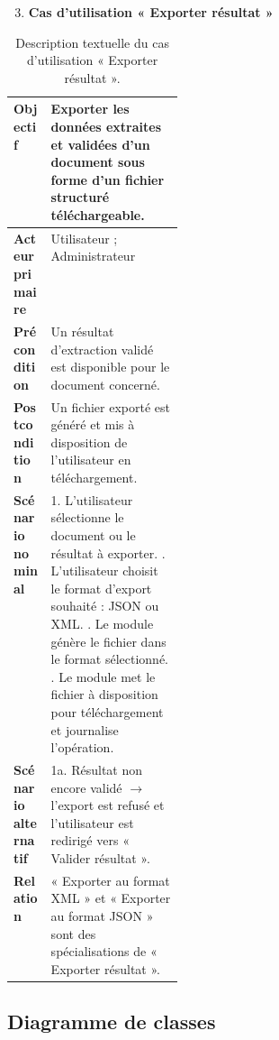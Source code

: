 \begin{enumerate}
    \setcounter{enumi}{2}
    \item \textbf{Cas d'utilisation « Exporter résultat »}
\end{enumerate}

\begin{table}[H]
    \centering
    \caption{Description textuelle du cas d'utilisation « Exporter résultat ».}
    \label{tab:cu-exporter-resultat}
    \begin{tabularx}{\linewidth}{|p{0.22\linewidth}|X|}
        \hline
        \rowcolor[HTML]{FFCCCC}
        \textbf{Objectif} & Exporter les données extraites et validées d'un document sous forme
        d'un fichier structuré téléchargeable. \\
        \hline
        \textbf{Acteur primaire} & Utilisateur ; Administrateur \\
        \hline
        \textbf{Précondition} & Un résultat d'extraction validé est disponible pour le document
        concerné. \\
        \hline
        \textbf{Postcondition} & Un fichier exporté est généré et mis à disposition de
        l'utilisateur en téléchargement. \\
        \hline
        \textbf{Scénario nominal} &
        1. L'utilisateur sélectionne le document ou le résultat à exporter. \newline
        2. L'utilisateur choisit le format d'export souhaité : JSON ou XML. \newline
        3. Le module génère le fichier dans le format sélectionné. \newline
        4. Le module met le fichier à disposition pour téléchargement et journalise
        l'opération. \\
        \hline
        \textbf{Scénario alternatif} &
        1a. Résultat non encore validé $\rightarrow$ l'export est refusé et l'utilisateur est
        redirigé vers « Valider résultat ». \\
        \hline
        \textbf{Relation} & « Exporter au format XML » et « Exporter au format JSON » sont des
        spécialisations de « Exporter résultat ». \\
        \hline
    \end{tabularx}
\end{table}

\subsection{Diagramme de classes}
\label{subsec:diagramme-classes}

